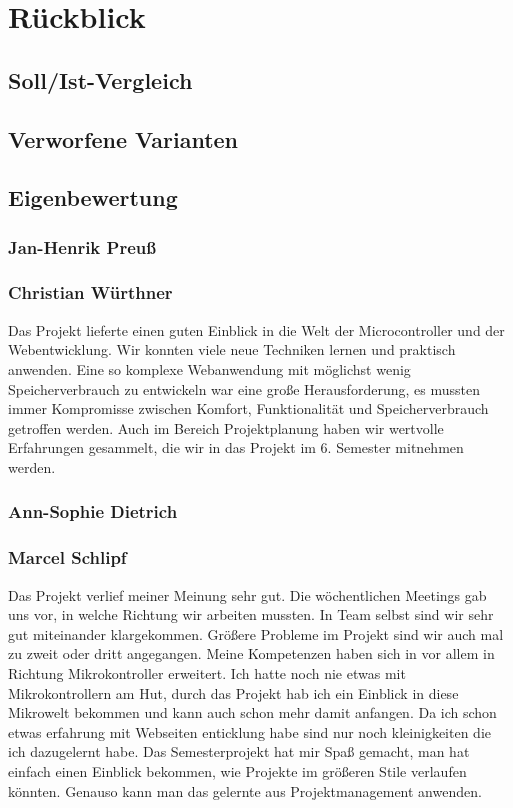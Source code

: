 \chapter{Rückblick}

\section{Soll/Ist-Vergleich}

\section{Verworfene Varianten}

\section{Eigenbewertung}

\subsection*{Jan-Henrik Preuß}

\subsection*{Christian Würthner}
Das Projekt lieferte einen guten Einblick in die Welt der Microcontroller und
der Webentwicklung. Wir konnten viele neue Techniken lernen und praktisch
anwenden. Eine so komplexe Webanwendung mit möglichst wenig Speicherverbrauch zu
entwickeln war eine große Herausforderung, es mussten immer Kompromisse zwischen
Komfort, Funktionalität und Speicherverbrauch getroffen werden. Auch im Bereich
Projektplanung haben wir wertvolle Erfahrungen gesammelt, die wir in das Projekt
im 6. Semester mitnehmen werden.

\subsection*{Ann-Sophie Dietrich}

\subsection*{Marcel Schlipf}
Das Projekt verlief meiner Meinung sehr gut. Die wöchentlichen Meetings gab uns
vor, in welche Richtung wir arbeiten mussten. In Team selbst sind wir sehr gut
miteinander klargekommen. Größere Probleme im Projekt sind wir auch mal zu zweit
oder dritt angegangen. \newline
Meine Kompetenzen haben sich in vor allem in Richtung Mikrokontroller erweitert.
Ich hatte noch nie etwas mit Mikrokontrollern am Hut, durch das Projekt hab ich
ein Einblick in diese Mikrowelt bekommen und kann auch schon mehr damit
anfangen.\newline
Da ich schon etwas erfahrung mit Webseiten enticklung habe sind nur noch
kleinigkeiten die ich dazugelernt habe.\newline
Das Semesterprojekt hat mir Spaß gemacht, man hat einfach einen Einblick
bekommen, wie Projekte im größeren Stile verlaufen könnten. Genauso kann man das
gelernte aus Projektmanagement anwenden.
